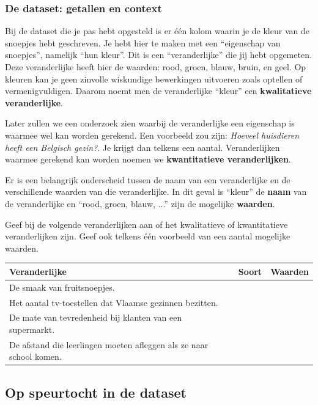 \documentclass[12pt,twoside]{article}
\begin{document}
\subsubsection{De dataset: getallen en context}
Bij de dataset die je pas hebt opgesteld is er één kolom waarin je de kleur van de snoepjes hebt
geschreven. Je hebt hier te maken met een “eigenschap van snoepjes”, namelijk “hun kleur”. Dit is
een “veranderlijke” die jij hebt opgemeten. Deze veranderlijke heeft hier de waarden: rood, groen,
blauw, bruin, en geel.
Op kleuren kan je geen zinvolle wiskundige bewerkingen uitvoeren zoals optellen of
vermenigvuldigen. Daarom noemt men de veranderlijke “kleur” een {\bf kwalitatieve veranderlijke}.

Later zullen we een onderzoek zien waarbij de veranderlijke een eigenschap is waarmee wel kan worden gerekend. Een voorbeeld zou zijn: {\em Hoeveel huisdieren heeft een Belgisch gezin?}. Je krijgt dan telkens een aantal. Veranderlijken waarmee gerekend kan worden noemen we {\bf kwantitatieve veranderlijken}.

Er is een belangrijk onderscheid tussen de naam van een veranderlijke en de
verschillende waarden van die veranderlijke.
In dit geval is “kleur” de {\bf naam} van de veranderlijke en “rood, groen, blauw,
...” zijn de mogelijke {\bf waarden}.

\begin{oefening}
Geef bij de volgende veranderlijken aan of het kwalitatieve of kwantitatieve veranderlijken zijn. Geef ook telkens één voorbeeld van een aantal mogelijke waarden.
\begin{center}
\begin{tabular}{p{6cm}|p{3cm}|p{3cm}}
Veranderlijke & Soort & Waarden\\
\hline
De smaak van fruitsnoepjes. & & \\
Het aantal tv-toestellen dat Vlaamse gezinnen bezitten. & &\\
De mate van tevredenheid bij klanten van een supermarkt. & &\\
De afstand die leerlingen moeten afleggen als ze naar school komen. & &\\  
\end{tabular}
\end{center}
\end{oefening}

\subsection{Op speurtocht in de dataset}
\end{document}
